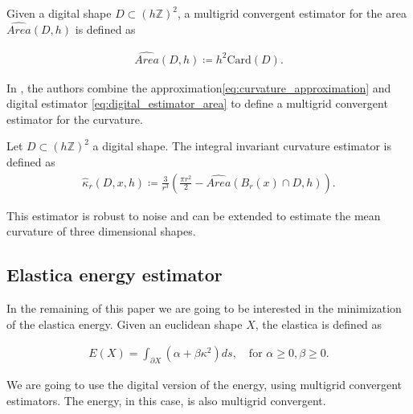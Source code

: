 \documentclass[runningheads]{llncs}
\begin{document}
\begin{definition}	
  Given a digital shape $D \subset (h \mathbb{Z})^2$, a multigrid convergent estimator for the area $\widehat{Area}(D,h)$ is defined as	
		
  \begin{align}
    \widehat{Area}(D,h) \coloneqq h^2\text{Card}\left( D \right).	
    \label{eq:digital_estimator_area}
  \end{align}
\end{definition}
	
In \cite{coeurjolly13integral}, the authors combine the approximation\eqref{eq:curvature_approximation} and digital estimator
\eqref{eq:digital_estimator_area} to define a multigrid convergent estimator for the curvature.

\begin{definition}
  Let $D \subset (h \mathbb{Z})^2$ a digital shape. The integral invariant curvature estimator is defined as
  \begin{align*}
    \hat{\kappa}_{r}(D,x,h) \coloneqq \frac{3}{r^3} \left( \frac{\pi r^2}{2} - \widehat{Area} \left( B_{r} ( x ) \cap D, h \right) \right).
  \end{align*}
\end{definition}


This estimator is robust to noise and can be extended to estimate the mean curvature of three dimensional shapes.

\subsection{Elastica energy estimator}

In the remaining of this paper we are going to be interested in the minimization of the elastica energy. Given an euclidean shape $X$, the elastica is defined as

\begin{align}
  E(X) = \int_{\partial X}{(\alpha + \beta \kappa^2) ds}, \quad \text{for~} \alpha \ge 0, \beta \ge 0.
  \label{eq:elastica}
\end{align}

We are going to use the digital version of the energy, using multigrid convergent estimators. The energy, in this case, is also multigrid convergent.
\end{document}
